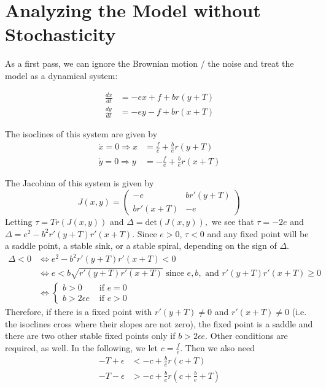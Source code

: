 \documentclass{article}
\begin{document}
\section{Analyzing the Model without Stochasticity }
As a first pass, we can ignore the Brownian motion / the noise and treat the model as a dynamical system:

\begin{align*}
\frac{dx}{dt}&=-ex+f+br(y+T)
\\ \frac{dy}{dt}&=-ey-f+br(x+T)
\end{align*}

The isoclines of this system are given by
\begin{align*}
\dot{x}=0 \Rightarrow x&=\frac{f}{e}+\frac{b}{e}r(y+T) 
\\\dot{y}=0 \Rightarrow y&=-\frac{f}{e}+\frac{b}{e}r(x+T)
\end{align*}

The Jacobian of this system is given by
$$J(x,y)=\left(\begin{array}{cccc} 
-e & br'(y+T)
\\ br'(x+T) & -e
\end{array}\right)$$
Letting $\tau=Tr(J(x,y))$ and $\Delta=\text{det}(J(x,y)),$ we see that $\tau=-2e$ and $\Delta=e^2-b^2r'(y+T)r'(x+T)$.  Since $e>0$, $\tau<0$ and any fixed point will be a saddle point, a stable sink, or a stable spiral, depending on the sign of $\Delta$.  
\begin{align*}
\Delta<0 &\Leftrightarrow e^2-b^2r'(y+T)r'(x+T)<0 
\\&\Leftrightarrow e<b\sqrt{r'(y+T)r'(x+T)} \text{ since } e,b, \text{ and } r'(y+T)r'(x+T)\geq0
\\ &\Leftrightarrow \left\{\begin{array}{cccc}
b>0 & \text{ if } e=0
\\ b>2\epsilon e & \text{ if } e>0
\end{array}\right.
\end{align*}
Therefore, if there is a fixed point with $r'(y+T)\neq 0$ and $r'(x+T)\neq 0$ (i.e. the isoclines cross where their slopes are not zero), the fixed point is a saddle and there are two other stable fixed points only if $b>2\epsilon e$.  Other conditions are required, as well.  In the following, we let $c=\frac{f}{e}$.  Then we also need
\begin{align}
-T+\epsilon&<-c+\frac{b}{e}r(c+T) \label{cond1} 
\\ -T-\epsilon&>-c+\frac{b}{e}r(c+\frac{b}{e}+T) \label{cond2}
\end{align}
\end{document}
